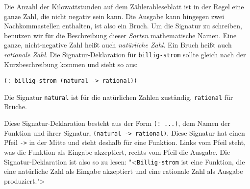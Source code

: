 Die Anzahl der Kilowattstunden auf dem Zählerableseblatt ist in der
Regel eine ganze Zahl, die nicht negativ sein kann.  Die Ausgabe kann
hingegen zwei Nachkommastellen enthalten, ist also ein Bruch.  Um die
Signatur zu schreiben, benutzen wir für die Beschreibung dieser
\textit{Sorten} mathematische Namen.  Eine ganze,
nicht-negative Zahl heißt auch \textit{natürliche
  Zahl}.\label{page:natural}  Ein Bruch heißt auch
\textit{rationale Zahl}.  Die
Signatur-Deklaration für \lstinline{billig-strom} sollte gleich nach der
Kurzbeschreibung kommen und sieht so aus:
%
\begin{lstlisting}
(: billig-strom (natural -> rational))
\end{lstlisting}
%
Die Signatur \lstinline{natural} ist für die natürlichen Zahlen zuständig,
\lstinline{rational} für Brüche.

Diese Signatur-Deklaration besteht aus der Form \lstinline{(: ...)},
dem Namen der Funktion und ihrer Signatur, \lstinline{(natural -> rational)}. 
Diese Signatur hat einen Pfeil \lstinline{->} in der Mitte und steht
deshalb für eine Funktion.  Links vom Pfeil steht, was
die Funktion als Eingabe akzeptiert, rechts vom Pfeil die Ausgabe. Die
Signatur-Deklaration ist also so zu lesen: "<\lstinline{Billig-strom} ist
eine Funktion, die eine natürliche Zahl als Eingabe akzeptiert und
eine rationale Zahl als Ausgabe produziert.">

